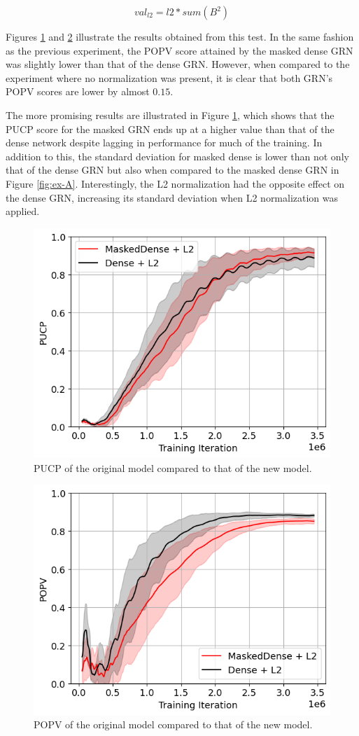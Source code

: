 \documentclass[twocolumn,a4paper,11pt]{article}
\begin{document}
    \begin{equation}
        val_{l2} = l2*sum(B^2)
        \label{eq:l2}
    \end{equation}

    Figures \ref{fig:ex-B} and \ref{fig:ex-B2} illustrate the results obtained from this test. In the same fashion as the previous experiment, the POPV score attained by the masked dense GRN was slightly lower than that of the dense GRN. However, when compared to the experiment where no normalization was present, it is clear that both GRN's POPV scores are lower by almost $0.15$.
    
    The more promising results are illustrated in Figure \ref{fig:ex-B}, which shows that the PUCP score for the masked GRN ends up at a higher value than that of the dense network despite lagging in performance for much of the training. In addition to this, the standard deviation for masked dense is lower than not only that of the dense GRN but also when compared to the masked dense GRN in Figure \ref{fig:ex-A}. Interestingly, the L2 normalization had the opposite effect on the dense GRN, increasing its standard deviation when L2 normalization was applied.

    \begin{figure}[h]
        \centering
        \includegraphics[width=0.7\linewidth]{ex-img/final-l2-pucp.png}
        \caption{PUCP of the original model compared to that of the new model.} \label{fig:ex-B}
    \end{figure}

    \begin{figure}[h]
        \centering
        \includegraphics[width=0.7\linewidth]{ex-img/final-l2-popv.png}
        \caption{POPV of the original model compared to that of the new model.} \label{fig:ex-B2}
    \end{figure}
\end{document}
